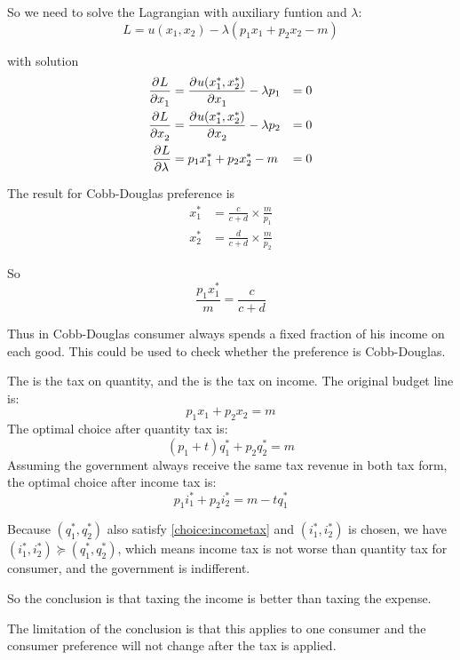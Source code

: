 So we need to solve the Lagrangian with auxiliary funtion and $\lambda$:
\begin{equation}
    L = u(x_1,x_2) - \lambda (p_1 x_1 + p_2 x_2 -m)
\end{equation}

with solution
\begin{equation}
    \begin{aligned}
        \dpd{L}{x_1} &= \dpd{u(x_1^*,x_2^*)}{x_1} - \lambda p_1 &= 0 \\
        \dpd{L}{x_2} &= \dpd{u(x_1^*,x_2^*)}{x_2} - \lambda p_2 &= 0 \\
        \dpd{L}{\lambda} &= p_1 x_1^* + p_2 x_2^* -m &= 0
    \end{aligned}
\end{equation}

\begin{example}
The result for Cobb-Douglas preference is
\begin{equation}
    \begin{aligned}
        x_1^* &= \frac{c}{c+d} \times \frac{m}{p_1} \\
        x_2^* &= \frac{d}{c+d} \times \frac{m}{p_2}
    \end{aligned}
\end{equation}

So
\begin{equation}
    \frac{p_1 x_1^*}{m} = \frac{c}{c+d}
\end{equation}

Thus in Cobb-Douglas consumer always spends a fixed fraction of his income on each good. This could be used to check whether the preference is Cobb-Douglas.
\end{example}

\begin{example}
    The  is the tax on quantity, and the  is the tax on income. The original budget line is:
    \begin{equation}
        p_1 x_1 + p_2 x_2 = m
    \end{equation}
    The optimal choice after quantity tax is:
    \begin{equation}
        (p_1 + t) q_1^* + p_2 q_2^* = m
    \end{equation}
    Assuming the government always receive the same tax revenue in both tax form, the optimal choice after income tax is:
    \begin{equation}\label{choice:incometax}
        p_1 i_1^* + p_2 i_2^* = m - t q_1^*
    \end{equation}
    
    Because $(q_1^*, q_2^*)$ also satisfy \eqref{choice:incometax} and $(i_1^*,i_2^*)$ is chosen, we have $(i_1^*,i_2^*) \succeq (q_1^*, q_2^*)$, which means income tax is not worse than quantity tax for consumer, and the government is indifferent.
    
    So the conclusion is that taxing the income is better than taxing the expense.
    
    The limitation of the conclusion is that this applies to one consumer and the consumer preference will not change after the tax is applied. 
\end{example}


